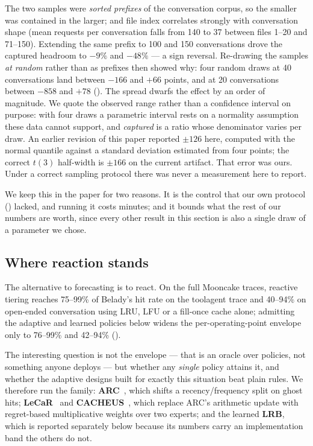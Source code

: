 The two samples were \emph{sorted prefixes} of the conversation corpus, so the smaller was contained in
the larger; and file index correlates strongly with conversation shape (mean requests per conversation
falls from 140 to 37 between files 1--20 and 71--150). Extending the same prefix to 100 and 150
conversations drove the captured headroom to $-9\%$ and $-48\%$ --- a sign reversal. Re-drawing the
samples \emph{at random} rather than as prefixes then showed why: four random draws at 40
conversations land between $-166$ and $+66$ points, and at 20 conversations between $-858$ and $+78$
(). The spread dwarfs the effect by an order of magnitude. We quote the observed range
rather than a confidence interval on purpose: with four draws a parametric interval rests on a normality
assumption these data cannot support, and \emph{captured} is a ratio whose denominator varies per draw.
An earlier revision of this paper reported $\pm126$ here, computed with the normal quantile against a
standard deviation estimated from four points; the correct $t(3)$ half-width is $\pm166$ on the current
artifact. That error was ours. Under a correct sampling protocol there was never a
measurement here to report.

We keep this in the paper for two reasons. It is the control that our own protocol
() lacked, and running it costs minutes; and it bounds what the rest of our numbers
are worth, since every other result in this section is also a single draw of a parameter we chose.



\subsection{Where reaction stands}
\label{sec:reaction}
The alternative to forecasting is to react. On the full Mooncake traces, reactive tiering
reaches 75--99\% of Belady's hit rate on the toolagent trace and 40--94\% on open-ended conversation
using LRU, LFU or a fill-once cache alone; admitting the adaptive and learned policies below widens the
per-operating-point envelope only to 76--99\% and 42--94\% ().

The interesting question is not the envelope --- that is an oracle over policies, not something anyone
deploys --- but whether any \emph{single} policy attains it, and whether the adaptive designs built for
exactly this situation beat plain rules. We therefore run the family: \textbf{ARC}~\cite{S7_megiddo2003arc},
which shifts a recency/frequency split on ghost hits; \textbf{LeCaR}~\cite{S8_vietri2018lecar} and
\textbf{CACHEUS}~\cite{S9_rodriguez2021cacheus}, which replace ARC's arithmetic update with regret-based
multiplicative weights over two experts; and the learned \textbf{LRB}, which is reported separately below because its
numbers carry an implementation band the others do not.

